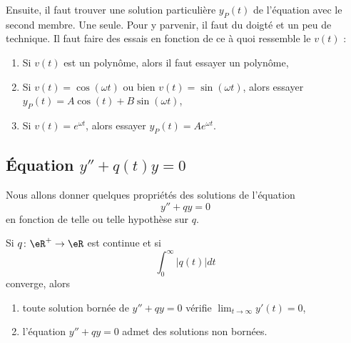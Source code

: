 Ensuite, il faut trouver une solution particulière \( y_P(t)\) de l'équation avec le second membre. Une seule. Pour y parvenir, il faut du doigté et un peu de technique. Il faut faire des essais en fonction de ce à quoi ressemble le \( v(t)\) :
\begin{enumerate}

	\item
	      Si \( v(t)\) est un polynôme, alors il faut essayer un polynôme,

	\item
	      Si \( v(t)=\cos(\omega t)\) ou bien \( v(t)=\sin(\omega t)\), alors essayer \( y_P(t)=A\cos(t)+B\sin(\omega t)\),

	\item
	      Si \( v(t)= e^{\omega t}\), alors essayer \( y_P(t)=A e^{\omega t}\).

\end{enumerate}

\subsection{Équation \texorpdfstring{\( y''+q(t)y=0\)}{y''+q(t)y=0}}
\label{subsecSyTwyM}


Nous allons donner quelques propriétés des solutions de l'équation
\begin{equation}
	y''+qy=0
\end{equation}
en fonction de telle ou telle hypothèse sur \( q\).

\begin{proposition}
	Si \( q\colon \eR^+\to \eR\) est continue et si
	\begin{equation}
		\int_0^{\infty}| q(t) |dt
	\end{equation}
	converge, alors
	\begin{enumerate}
		\item
		      toute solution bornée de \( y''+qy=0\) vérifie \( \lim_{t\to \infty} y'(t)=0\),
		\item
		      l'équation \( y''+qy=0\) admet des solutions non bornées.
	\end{enumerate}
\end{proposition}

